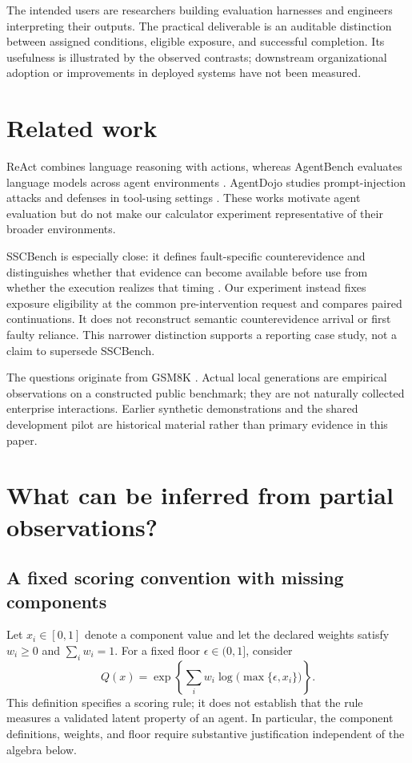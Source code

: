 \documentclass[10pt]{article}
\begin{document}
The intended users are researchers building evaluation harnesses and engineers interpreting their outputs. The practical deliverable is an auditable distinction between assigned conditions, eligible exposure, and successful completion. Its usefulness is illustrated by the observed contrasts; downstream organizational adoption or improvements in deployed systems have not been measured.

\section{Related work}
ReAct combines language reasoning with actions, whereas AgentBench evaluates language models across agent environments \citep{yao2023react,liu2024agentbench}. AgentDojo studies prompt-injection attacks and defenses in tool-using settings \citep{debenedetti2024agentdojo}. These works motivate agent evaluation but do not make our calculator experiment representative of their broader environments.

SSCBench is especially close: it defines fault-specific counterevidence and distinguishes whether that evidence can become available before use from whether the execution realizes that timing \citep{he2026sscbench}. Our experiment instead fixes exposure eligibility at the common pre-intervention request and compares paired continuations. It does not reconstruct semantic counterevidence arrival or first faulty reliance. This narrower distinction supports a reporting case study, not a claim to supersede SSCBench.

The questions originate from GSM8K \citep{cobbe2021gsm8k}. Actual local generations are empirical observations on a constructed public benchmark; they are not naturally collected enterprise interactions. Earlier synthetic demonstrations and the shared development pilot are historical material rather than primary evidence in this paper.

\section{What can be inferred from partial observations?}
\label{sec:partial-observation}

\subsection{A fixed scoring convention with missing components}
Let $x_i\in[0,1]$ denote a component value and let the declared weights satisfy
$w_i\geq0$ and $\sum_i w_i=1$. For a fixed floor $\epsilon\in(0,1]$, consider
\begin{equation}
 Q(x)=\exp\left\{\sum_i w_i\log\bigl(\max\{\epsilon,x_i\}\bigr)\right\}.
 \label{eq:declared-score}
\end{equation}
This definition specifies a scoring rule; it does not establish that the rule
measures a validated latent property of an agent. In particular, the component
definitions, weights, and floor require substantive justification independent
of the algebra below.
\end{document}
